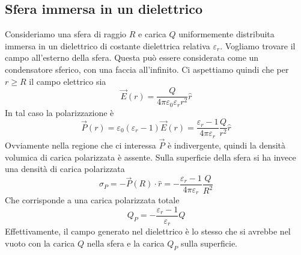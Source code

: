 \documentclass[a4paper,11pt]{book}
\let\oldepsilon\epsilon
\let\oldvarepsilon\varepsilon
\renewcommand{\epsilon}{\oldvarepsilon}
\renewcommand{\varepsilon}{\oldepsilon}
\theoremstyle{definition}
\theoremstyle{theorem}
\begin{document}
\subsection{Sfera immersa in un dielettrico}
Consideriamo una sfera di raggio $R$ e carica $Q$ uniformemente distribuita immersa in un dielettrico di costante dielettrica relativa $\epsilon_r$. Vogliamo trovare il campo all'esterno della sfera. Questa può essere considerata come un condensatore sferico, con una faccia all'infinito. Ci aspettiamo quindi che per $r\geq R$ il campo elettrico sia
\[\vec{E}(r)=\frac{Q}{4\pi\epsilon_0\epsilon_rr^2}\hat{r}\]
In tal caso la polarizzazione è
\[\vec{P}(r)=\epsilon_0(\epsilon_r-1)\vec{E}(r)=\frac{\epsilon_r-1}{4\pi\epsilon_r}\frac{Q}{r^2}\hat{r}\]
Ovviamente nella regione che ci interessa $\vec{P}$ è indivergente, quindi la densità volumica di carica polarizzata è assente. Sulla superficie della sfera si ha invece una densità di carica polarizzata
\[\sigma_P=-\vec{P}(R)\cdot\hat{r}=-\frac{\epsilon_r-1}{4\pi\epsilon_r}\frac{Q}{R^2}\]
Che corrisponde a una carica polarizzata totale
\[Q_P=-\frac{\epsilon_r-1}{\epsilon_r}Q\]
Effettivamente, il campo generato nel dielettrico è lo stesso che si avrebbe nel vuoto con la carica $Q$ nella sfera e la carica $Q_P$ sulla superficie.
\end{document}
